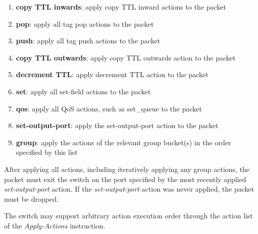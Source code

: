 \documentclass[10pt]{article}
\begin{document}
\begin{enumerate}
\item \textbf{copy TTL inwards}: apply copy TTL inward actions to the packet
\item \textbf{pop}: apply all tag pop actions to the packet
\item \textbf{push}: apply all tag push actions to the packet
\item \textbf{copy TTL outwards}: apply copy TTL outwards action to the packet
\item \textbf{decrement TTL}: apply decrement TTL action to the packet
\item \textbf{set}: apply all set-field actions to the packet
\item \textbf{qos}: apply all QoS actions, such as set\_queue to the packet
\item \textbf{set-output-port}: apply the set-output-port action to the packet
\item \textbf{group}: apply the actions of the relevant group bucket(s) in the order specified by this list
\end{enumerate}

After applying all actions, including iteratively applying any group actions, the packet must exit the switch on the port specified by the most recently applied \emph{set-output-port} action.  If the \emph{set-output-port} action was never applied, the packet must be dropped.

The switch may support arbitrary action execution order through the action list of the \textit{Apply-Actions} instruction. 
\end{document}
